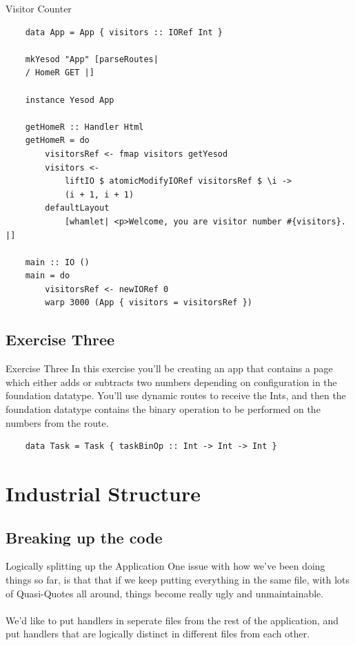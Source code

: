 \documentclass[pdf]{beamer}
\begin{document}
\begin{frame}[fragile]{Visitor Counter}
  \begin{verbatim}
    data App = App { visitors :: IORef Int }

    mkYesod "App" [parseRoutes|
    / HomeR GET |]

    instance Yesod App

    getHomeR :: Handler Html
    getHomeR = do
        visitorsRef <- fmap visitors getYesod
        visitors <-
            liftIO $ atomicModifyIORef visitorsRef $ \i ->
            (i + 1, i + 1)
        defaultLayout
            [whamlet| <p>Welcome, you are visitor number #{visitors}. |]

    main :: IO ()
    main = do
        visitorsRef <- newIORef 0
        warp 3000 (App { visitors = visitorsRef })
  \end{verbatim}
\end{frame}

\subsection{Exercise Three}
\begin{frame}[fragile]{Exercise Three}
  In this exercise you'll be creating an app that contains a page
  which either adds or subtracts two numbers depending on
  configuration in the foundation datatype. You'll use dynamic routes
  to receive the Ints, and then the foundation datatype contains the
  binary operation to be performed on the numbers from the route.

  \begin{verbatim}
    data Task = Task { taskBinOp :: Int -> Int -> Int }
  \end{verbatim}
\end{frame}

\section{Industrial Structure}
\subsection{Breaking up the code}
\begin{frame}{Logically splitting up the Application}
  One issue with how we've been doing things so far, is that that if
  we keep putting everything in the same file, with lots of
  Quasi-Quotes all around, things become really ugly and unmaintainable.\\
  \\
  We'd like to put handlers in seperate files from the rest of the
  application, and put handlers that are logically distinct in
  different files from each other.
\end{frame}
\end{document}
